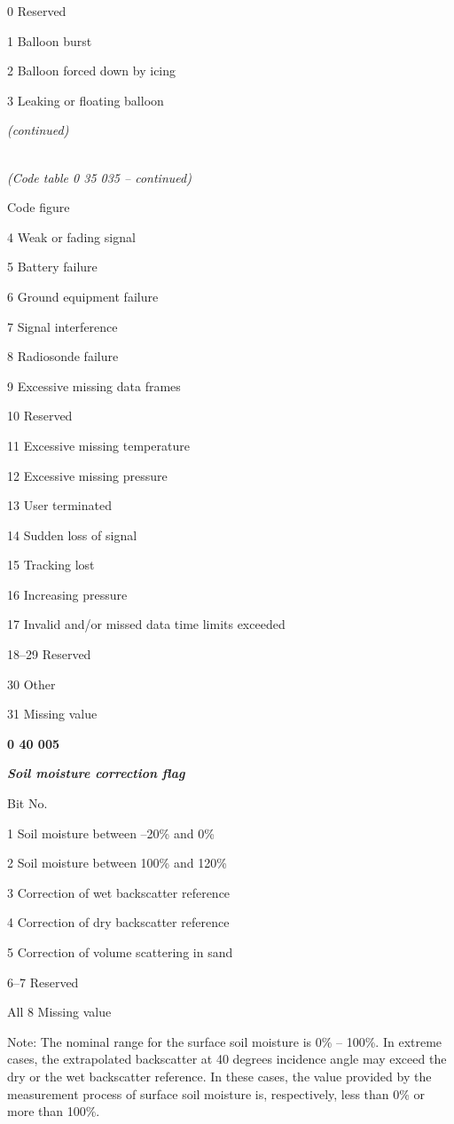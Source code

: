 0 Reserved

1 Balloon burst

2 Balloon forced down by icing

3 Leaking or floating balloon

\emph{(continued)}

\emph{\\
(Code table 0 35 035 -- continued)}

Code figure

4 Weak or fading signal

5 Battery failure

6 Ground equipment failure

7 Signal interference

8 Radiosonde failure

9 Excessive missing data frames

10 Reserved

11 Excessive missing temperature

12 Excessive missing pressure

13 User terminated

14 Sudden loss of signal

15 Tracking lost

16 Increasing pressure

17 Invalid and/or missed data time limits exceeded

18--29 Reserved

30 Other

31 Missing value

\textbf{0 40 005}

\emph{\textbf{Soil moisture correction flag}}

Bit No.

1 Soil moisture between --20\% and 0\%

2 Soil moisture between 100\% and 120\%

3 Correction of wet backscatter reference

4 Correction of dry backscatter reference

5 Correction of volume scattering in sand

6--7 Reserved

All 8 Missing value

Note: The nominal range for the surface soil moisture is 0\% -- 100\%. In extreme cases, the extrapolated backscatter at 40 degrees incidence angle may exceed the dry or the wet backscatter reference. In these cases, the value provided by the measurement process of surface soil moisture is, respectively, less than 0\% or more than 100\%.

